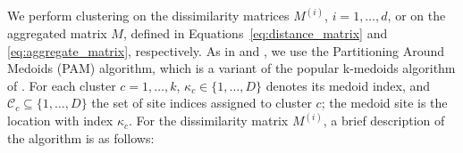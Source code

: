 \documentclass[12pt,compact]{article}
\begin{document}
We perform clustering on the dissimilarity matrices $M^{(i)}$, $i = 1, \ldots, d$, or on the aggregated matrix $M$, defined in Equations~\eqref{eq:distance_matrix} and \eqref{eq:aggregate_matrix}, respectively.
As in \citet{Bernard2013} and \citet{Vignotto2021}, we use the Partitioning Around Medoids (PAM) algorithm, which is a variant of the popular k-medoids algorithm of \citet{Kaufman1987}.
For each cluster $c = 1, \ldots, k$, $\kappa_c \in \{1, \ldots, D\}$ denotes its medoid index, and $\mathcal{C}_c \subseteq \{1, \ldots, D\}$ the set of site indices assigned to cluster $c$; the medoid site is the location with index $\kappa_c$.
For the dissimilarity matrix $M^{(i)}$, a brief description of the algorithm is as follows:
\end{document}
